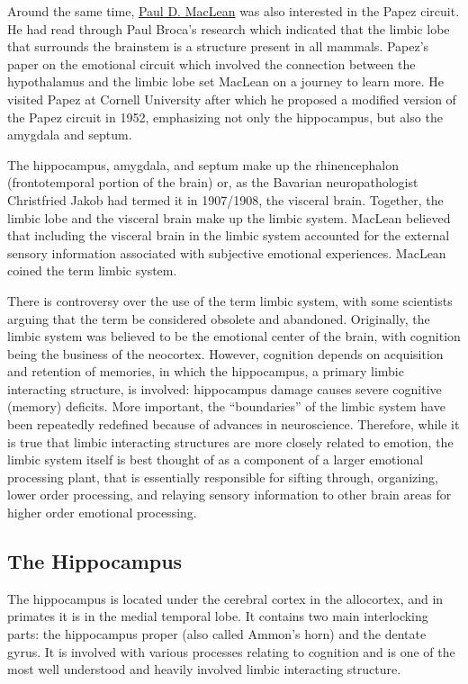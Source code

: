 Around the same time, \href{https://en.wikipedia.org/wiki/Paul_D._MacLean}{Paul D. MacLean} was also interested in the Papez circuit. He had read through Paul Broca's research which indicated that the limbic lobe that surrounds the brainstem is a structure present in all mammals. Papez's paper on the emotional circuit which involved the connection between the hypothalamus and the limbic lobe set MacLean on a journey to learn more. He visited Papez at Cornell University after which he proposed a modified version of the Papez circuit in 1952, emphasizing not only the hippocampus, but also the amygdala and septum.

The hippocampus, amygdala, and septum make up the rhinencephalon (frontotemporal portion of the brain) or, as the Bavarian neuropathologist Christfried Jakob had termed it in 1907/1908, the visceral brain. Together, the limbic lobe and the visceral brain make up the limbic system. MacLean believed that including the visceral brain in the limbic system accounted for the external sensory information associated with subjective emotional experiences. MacLean coined the term limbic system.

There is controversy over the use of the term limbic system, with some scientists arguing that the term be considered obsolete and abandoned. Originally, the limbic system was believed to be the emotional center of the brain, with cognition being the business of the neocortex. However, cognition depends on acquisition and retention of memories, in which the hippocampus, a primary limbic interacting structure, is involved: hippocampus damage causes severe cognitive (memory) deficits. More important, the ``boundaries'' of the limbic system have been repeatedly redefined because of advances in neuroscience. Therefore, while it is true that limbic interacting structures are more closely related to emotion, the limbic system itself is best thought of as a component of a larger emotional processing plant, that is essentially responsible for sifting through, organizing, lower order processing, and relaying sensory information to other brain areas for higher order emotional processing.

\hypertarget{the-hippocampus}{%
\subsection{The Hippocampus}\label{the-hippocampus}}

The hippocampus is located under the cerebral cortex in the allocortex, and in primates it is in the medial temporal lobe. It contains two main interlocking parts: the hippocampus proper (also called Ammon's horn) and the dentate gyrus. It is involved with various processes relating to cognition and is one of the most well understood and heavily involved limbic interacting structure.

